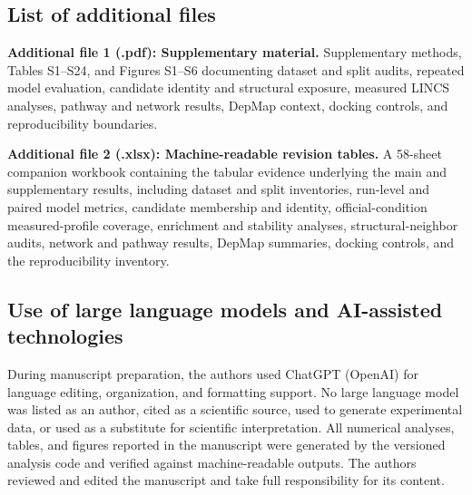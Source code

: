 \begin{roundtworevision}
\subsection*{List of additional files}
\noindent\textbf{Additional file 1 (.pdf): Supplementary material.} Supplementary methods, Tables S1--S24, and Figures S1--S6 documenting dataset and split audits, repeated model evaluation, candidate identity and structural exposure, measured LINCS analyses, pathway and network results, DepMap context, docking controls, and reproducibility boundaries.

\noindent\textbf{Additional file 2 (.xlsx): Machine-readable revision tables.} A 58-sheet companion workbook containing the tabular evidence underlying the main and supplementary results, including dataset and split inventories, run-level and paired model metrics, candidate membership and identity, official-condition measured-profile coverage, enrichment and stability analyses, structural-neighbor audits, network and pathway results, DepMap summaries, docking controls, and the reproducibility inventory.
\end{roundtworevision}

\subsection*{Use of large language models and AI-assisted technologies}
During manuscript preparation, the authors used ChatGPT (OpenAI) for language editing, organization, and formatting support. No large language model was listed as an author, cited as a scientific source, used to generate experimental data, or used as a substitute for scientific interpretation. All numerical analyses, tables, and figures reported in the manuscript were generated by the versioned analysis code and verified against machine-readable outputs. The authors reviewed and edited the manuscript and take full responsibility for its content.
